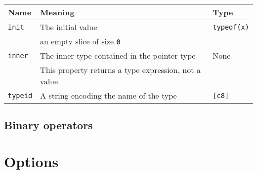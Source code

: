 \vspace{-20pt}%
\begin{center}\begin{adjustbox}{max width=\linewidth}
  \begin{tabular}{|l|ll|}
    \hline
    Name & Meaning & Type\\
    \hline
    \hline
    \texttt{init} & The initial value & \texttt{typeof(x)}\\
    & an empty slice of size \texttt{0} & \\
    \Xhline{0.001pt}

    \texttt{inner} & The inner type contained in the pointer type & None\\
    & This property returns a type expression, not a value &\\
    \hline
    \texttt{typeid} & A string encoding the name of the type & \texttt{[c8]} \\
    \hline
  \end{tabular}
\end{adjustbox}\end{center}

\subsection {Binary operators}

\section {Options}
